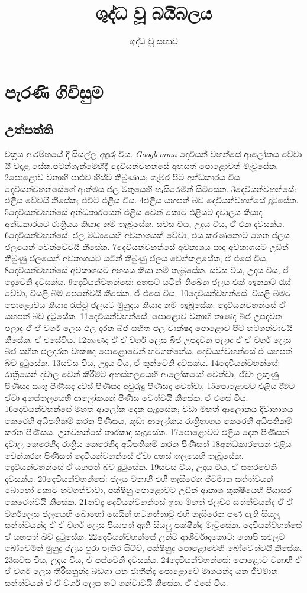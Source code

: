 \documentclass[10pt]{book}
\title{\bf ශුද්ධ වූ බයිබලය}
\author{ශුද්ධ වූ සභාව}
\begin{document}
                        
\frontmatter                            
\maketitle                              
\tableofcontents                        
\listoffigures
\listoftables
\mainmatter                             
\part{පැරණි ගිවිසුම}                   
\chapter{උත්පත්ති}                
වක්‍රය {ආරම්භයේ} දී සියල්ල \textit{අඳුරු} විය. \textit{Googlemma} දෙවියන් වහන්සේ ආලෝකය වේවා යි වදාළ  සේක.පටන්ගැන්මෙහිදී දෙවියන්වහන්සේ අහසත් පොළොවත් මැවූසේක. 2පොළොව වනාහි පාළුව හිස්ව තිබුණාය; ගැඹුර පිට අන්ධකාරය විය. දෙවියන්වහන්සේගේ ආත්මය ජල මතුයෙහි හැසිරෙමින් සිටිසේක. 3දෙවියන්වහන්සේ: එළිය වේවයි කීසේක; එවිට එළිය විය. 4එළිය යහපත් බව දෙවියන්වහන්සේ දුටුසේක. 5දෙවියන්වහන්සේ අන්ධකාරයෙන් එළිය වෙන් කොට එළියට දවාලය කියාද අන්ධකාරයට රාත්‍රියය කියාද නම් තැබූසේක. සවස විය, උදය විය, ඒ එක දවසක්ය. 6දෙවියන්වහන්සේ: ජල මධ්‍යයෙහි අවකාශයක් වේවා, එය කරණකොට ගෙන ජලය ජලයෙන් වෙන්වේවයි කීසේක. 7දෙවියන්වහන්සේ අවකාශය සාදා අවකාශයට උඩින් තිබුණු ජලයෙන් අවකාශයට යටින් තිබුණු ජලය වෙන්කළසේක; ඒ එසේ විය. 8දෙවියන්වහන්සේ අවකාශයට අහසය කියා නම් තැබූසේක. සවස විය, උදය විය, ඒ දෙවෙනි දවසක්ය. 9දෙවියන්වහන්සේ: අහසට යටින් තිබෙන ජලය එක් තැනකට රැස් වේවා, වියළි බිම පෙනේවයි කීසේක. ඒ එසේ විය. 10දෙවියන්වහන්සේ: වියළි බිමට පොළොවය කියාද රැස්වූ ජලයට මුහුදය කියාද නම් තැබූසේක. දෙවියන්වහන්සේ ඒ යහපත් බව දුටුසේක. 11දෙවියන්වහන්සේ: පොළොව වනාහි තෘණද බීජ උපදවන පලාද ඒ ඒ වර්ග ලෙස ඵල දරන බීජ සහිත ඵල වෘක්ෂද පොළොව පිට හටගන්වාවයි කීසේක. ඒ එසේවිය. 12තෘණද ඒ ඒ වර්ග ලෙස බීජ උපදවන පලාද ඒ ඒ වර්ග ලෙස බීජ සහිත ඵලදරන වෘක්ෂද පොළොවෙන් හටගත්තේය. දෙවියන්වහන්සේ ඒ යහපත් බව දුටුසේක. 13සවස විය, උදය විය, ඒ තුන්වෙනි දවසක්ය. 14දෙවියන්වහන්සේ: රාත්‍රියෙන් දවාල වෙන් කිරීමට අහස්තලයෙහි ආලෝකයෝ වෙත්වා, ඒවා ලකුණු පිණිසද සෘතු පිණිසද දවස් පිණිසද අවුරුදු පිණිසද වෙත්වා, 15පොළොවට එළිය දීමට ඒවා අහස්තලයෙහි ආලෝකයන් පිණිස වෙත්වයි කීසේක. ඒ එසේ විය. 16දෙවියන්වහන්සේ මහත් ආලෝක දෙක සෑදූසේක; වඩා මහත් ආලෝකය දිවාභාගය කෙරෙහි අධිපතිකම් කරන පිණිසය, කුඩා ආලෝකය රාත්‍රිභාගය කෙරෙහි අධිපතිකම් කරන පිණිසය. උන්වහන්සේ තාරකාද සෑදූසේක. 17පොළොවට එළිය දෙන පිණිසත් දවාල කෙරෙහිද රාත්‍රිය කෙරෙහිද අධිපතිකම් කරන පිණිසත් 18අන්ධකාරයෙන් එළිය වෙන්කරන පිණිසත් දෙවියන්වහන්සේ ඒවා අහස් තලයෙහි තැබූසේක. දෙවියන්වහන්සේ ඒ යහපත් බව දුටුසේක. 19සවස විය, උදය විය, ඒ සතරවෙනි දවසක්ය. 20දෙවියන්වහන්සේ: ජලය වනාහි එහි හැසිරෙන ජීවමාන සත්ත්වයන් බොහෝ කොට හටගන්වාවා, පක්ෂීහු පොළොවට උඩින් ආකාශ කුක්ෂීයෙහි පියාසර කෙරෙත්වයි කීසේක. 21තවද දෙවියන්වහන්සේ ඉතා මහත් ජලචර සත්ත්වයන්ද ඒ ඒ වර්ගලෙස ජලයෙහි බොහෝ සෙයින් හටගත්තාවූ එහි හැසිරෙන පණ ඇති සියලු සත්ත්වයන්ද ඒ ඒ වර්ග ලෙස පියාපත් ඇති සියලු පක්ෂීන්ද මැවූසේක. දෙවියන්වහන්සේ ඒ යහපත් බව දුටුසේක. 22දෙවියන්වහන්සේ උන්ට ආශීර්වාදකොට: තොපි සඵලව බෝවෙමින් මුහුදු ජලය පුරා පැතිර සිටිව්, පක්ෂීහුද පොළොවෙහි බෝවෙත්වයි කීසේක. 23සවස විය, උදය විය, ඒ පස්වෙනි දවසක්ය. 24දෙවියන්වහන්සේ: පොළොව වනාහි ඒ ඒ වර්ග ලෙස තිරිසනුන්ද බඩගා යන ජාතීන්ද පොළොවේ මෘගයන්ද යන ජීවමාන සත්ත්වයන් ඒ ඒ වර්ග ලෙස හට ගන්වාවයි කීසේක. ඒ එසේ විය. 
\end{document}
